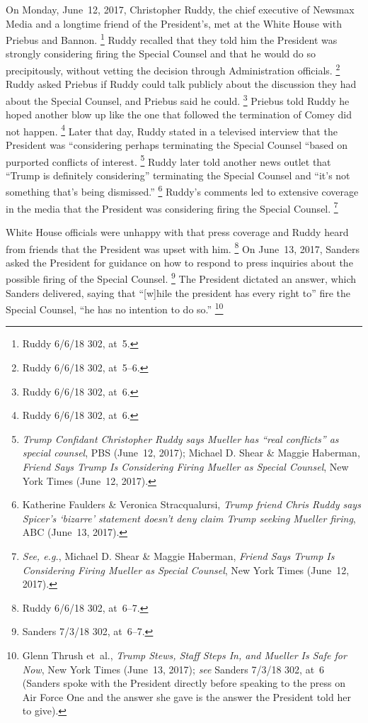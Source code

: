 On Monday, June~12, 2017, Christopher Ruddy, the chief executive of Newsmax Media and a longtime friend of the President's, met at the White House with Priebus and Bannon.%
\footnote{Ruddy 6/6/18 302, at~5.}
Ruddy recalled that they told him the President was strongly considering firing the Special Counsel and that he would do so precipitously, without vetting the decision through Administration officials.%
\footnote{Ruddy 6/6/18 302, at~5--6.}
Ruddy asked Priebus if Ruddy could talk publicly about the discussion they had about the Special Counsel, and Priebus said he could.%
\footnote{Ruddy 6/6/18 302, at~6.}
Priebus told Ruddy he hoped another blow up like the one that followed the termination of Comey did not happen.%
\footnote{Ruddy 6/6/18 302, at~6.}
Later that day, Ruddy stated in a televised interview that the President was ``considering perhaps terminating the Special Counsel ``based on purported conflicts of interest.%
\footnote{\textit{Trump Confidant Christopher Ruddy says Mueller has ``real conflicts'' as special counsel}, PBS (June~12, 2017);
Michael D. Shear \& Maggie Haberman, \textit{Friend Says Trump Is Considering Firing Mueller as Special Counsel}, New York Times (June~12, 2017).}
Ruddy later told another news outlet that ``Trump is definitely considering'' terminating the Special Counsel and ``it's not something that's being dismissed.''%
\footnote{Katherine Faulders \& Veronica Stracqualursi, \textit{Trump friend Chris Ruddy says Spicer's `bizarre' statement doesn't deny claim Trump seeking Mueller firing}, ABC (June~13, 2017).}
Ruddy's comments led to extensive coverage in the media that the President was considering firing the Special Counsel.%
\footnote{\textit{See, e.g.}, Michael D. Shear \& Maggie Haberman, \textit{Friend Says Trump Is Considering Firing Mueller as Special Counsel}, New York Times (June~12, 2017).}

White House officials were unhappy with that press coverage and Ruddy heard from friends that the President was upset with him.%
\footnote{Ruddy 6/6/18 302, at~6--7.}
On June~13, 2017, Sanders asked the President for guidance on how to respond to press inquiries about the possible firing of the Special Counsel.%
\footnote{Sanders 7/3/18 302, at~6--7.}
The President dictated an answer, which Sanders delivered, saying that ``[w]hile the president has every right to'' fire the Special Counsel, ``he has no intention to do so.''%
\footnote{Glenn Thrush et~al., \textit{Trump Stews, Staff Steps In, and Mueller Is Safe for Now}, New York Times (June~13, 2017);
\textit{see} Sanders 7/3/18 302, at~6 (Sanders spoke with the President directly before speaking to the press on Air Force One and the answer she gave is the answer the President told her to give).}

